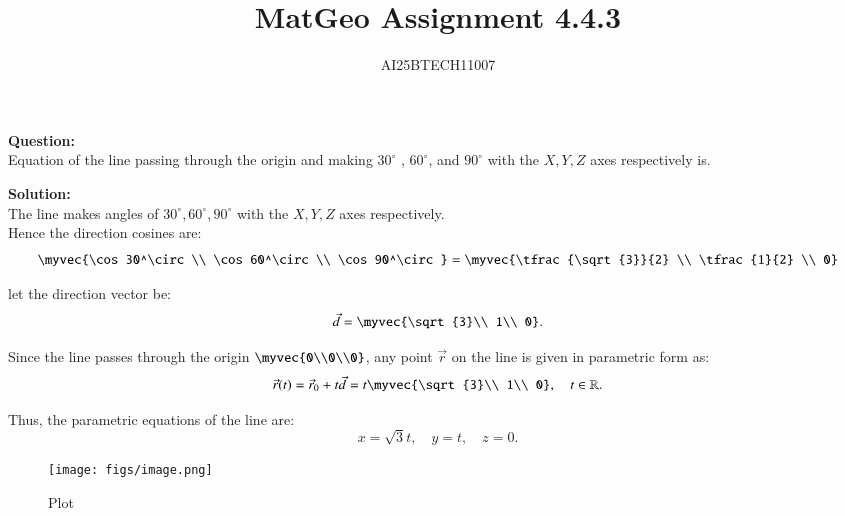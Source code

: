 \documentclass[journal]{IEEEtran}
\begin{document}

\vspace{3cm}

\title{MatGeo Assignment 4.4.3}
\author{AI25BTECH11007}
 \maketitle
{\let\newpage\relax\maketitle}

\renewcommand{\thefigure}{\theenumi}
\renewcommand{\thetable}{\theenumi}
\setlength{\intextsep}{10pt} %


\renewcommand{\thetable}{\theenumi}
\textbf{Question:}\\
Equation of the line passing through the origin and making $30^\circ$
, $60^\circ$, and $90^\circ$ with the $X, Y, Z$ axes respectively is.

\bigskip

\noindent
\textbf{Solution:}\\
The line makes angles of $30^\circ, 60^\circ, 90^\circ$ with the $X, Y, Z$ axes respectively. \\

Hence the direction cosines are:
\[
\myvec{\cos 30^\circ \\ \cos 60^\circ \\ \cos 90^\circ}
= \myvec{\tfrac{\sqrt{3}}{2} \\ \tfrac{1}{2} \\ 0}
\]

let the direction vector be:
\[
\vec{d} = 
\myvec{\sqrt{3}\\ 1\\ 0}.
\]

Since the line passes through the origin $\myvec{0\\0\\0}$, any point $\vec{r}$ on the line is given in parametric form as:
\[
\vec{r}(t) = \vec{r}_0 + t\vec{d} 
= t\myvec{\sqrt{3}\\ 1\\ 0}, \quad t \in \mathbb{R}.
\]

Thus, the parametric equations of the line are:
\[
x = \sqrt{3}t, \quad y = t, \quad z = 0.
\]

\begin{figure}[H]
    \centering
    \texttt{[image: figs/image.png]}
    \caption{Plot}
    \label{fig:placeholder}
\end{figure}
\end{document}

